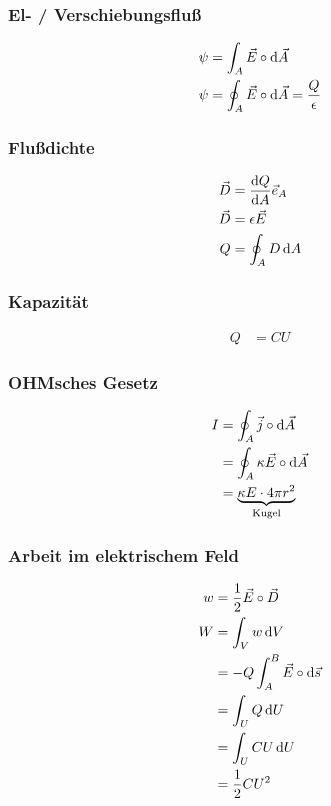 \newpage
\begin{multicols}{2}{}
\subsubsection*{El- / Verschiebungsfluß}
\begin{align*}
\psi&=\int_A\vec{E}\circ\mathop{}\!\mathrm{d}\vec{A}\\
\psi&=\oint_A\vec{E}\circ\mathop{}\!\mathrm{d}\vec{A}=\frac{Q}{\epsilon}\\
\end{align*}

\subsubsection*{Flußdichte}
\begin{align*}
\vec{D}&=\frac{\mathop{}\!\mathrm{d} Q}{\mathop{}\!\mathrm{d} A}\vec{e}_A\\
\vec{D}&=\epsilon\vec{E}\\
Q&=\oint_AD\mathop{}\!\mathrm{d} A
\end{align*}
\end{multicols}

\subsubsection*{Kapazität}
\begin{align*}
Q&=CU
\end{align*}

\begin{multicols}{2}{}
\subsubsection*{OHMsches Gesetz}
\begin{align*}
I &=\oint_A\vec{j}\circ\mathop{}\!\mathrm{d}\vec{A}\\
  &=\oint_A \kappa\vec{E}\circ\mathop{}\!\mathrm{d}\vec{A}\\
  &=\underbrace{\kappa E\cdot 4\pi r^2}_{\text{Kugel}}
\end{align*}
\vspace{20mm}

\subsubsection*{Arbeit im elektrischem Feld}
\begin{align*}
w&=\frac{1}{2}\vec{E}\circ\vec{D}\\
W&=\int_Vw\mathop{}\!\mathrm{d} V\\
 &=-Q\int_A^B\vec{E}\circ\mathop{}\!\mathrm{d}\vec{s}\\
 &=\int_U Q\mathop{}\!\mathrm{d} U\\
 &= \int_U CU \mathop{}\!\mathrm{d} U\\
 &=\frac{1}{2}CU^2
\end{align*}
\end{multicols}
